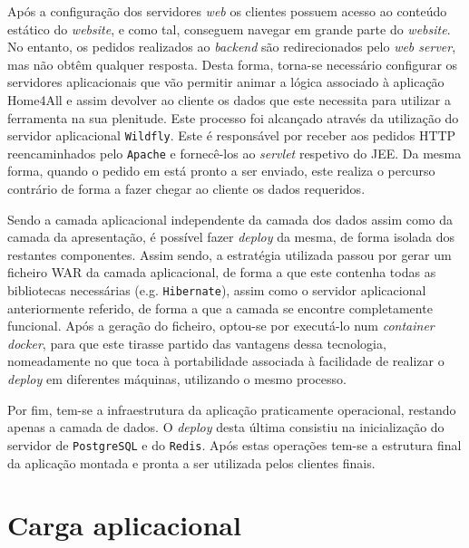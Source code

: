 Após a configuração dos servidores \textit{web} os clientes possuem acesso ao conteúdo estático do \textit{website}, e como tal, conseguem navegar em grande parte do \textit{website}. No entanto, os pedidos realizados ao \textit{backend} são redirecionados pelo \textit{web server}, mas não obtêm qualquer resposta. Desta forma, torna-se necessário configurar os servidores aplicacionais que vão permitir animar a lógica associado à aplicação Home4All e assim devolver ao cliente os dados que este necessita para utilizar a ferramenta na sua plenitude. Este processo foi alcançado através da utilização do servidor aplicacional \texttt{Wildfly}. Este é responsável por receber aos pedidos HTTP reencaminhados pelo \texttt{Apache} e fornecê-los ao \textit{servlet} respetivo do JEE. Da mesma forma, quando o pedido em está pronto a ser enviado, este realiza o percurso contrário de forma a fazer chegar ao cliente os dados requeridos. 

Sendo a camada aplicacional independente da camada dos dados assim como da camada da apresentação, é possível fazer \textit{deploy} da mesma, de forma isolada dos restantes componentes. Assim sendo, a estratégia utilizada passou por gerar um ficheiro WAR da camada aplicacional, de forma a que este contenha todas as bibliotecas necessárias (e.g. \texttt{Hibernate}), assim como o servidor aplicacional anteriormente referido, de forma a que a camada se encontre completamente funcional. Após a geração do ficheiro, optou-se por executá-lo num \textit{container docker}, para que este tirasse partido das vantagens dessa tecnologia, nomeadamente no que toca à portabilidade associada à facilidade de realizar o \textit{deploy} em diferentes máquinas, utilizando o mesmo processo.

Por fim, tem-se a infraestrutura da aplicação praticamente operacional, restando apenas a camada de dados. O \textit{deploy} desta última consistiu na inicialização do servidor de \texttt{PostgreSQL} e do \texttt{Redis}. Após estas operações tem-se a estrutura final da aplicação montada e pronta a ser utilizada pelos clientes finais.




\newpage
\section{Carga aplicacional}



